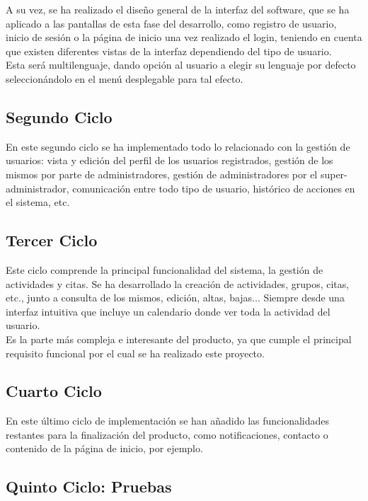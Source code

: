 A su vez, se ha realizado el diseño general de la interfaz del software, que se ha aplicado a las pantallas de esta fase del desarrollo, como registro de usuario, inicio de sesión o la página de inicio una vez realizado el login, teniendo en cuenta que existen diferentes vistas de la interfaz dependiendo del tipo de usuario. \\
Esta será multilenguaje, dando opción al usuario a elegir su lenguaje por defecto seleccionándolo en el menú desplegable para tal efecto.

\subsection{Segundo Ciclo}

En este segundo ciclo se ha implementado todo lo relacionado con la gestión de usuarios: vista y edición del perfil de los usuarios registrados, gestión de los mismos por parte de administradores, gestión de administradores por el super-administrador, comunicación entre todo tipo de usuario, histórico de acciones en el sistema, etc.

\subsection{Tercer Ciclo}

Este ciclo comprende la principal funcionalidad del sistema, la gestión de actividades y citas. Se ha desarrollado la creación de actividades, grupos, citas, etc., junto a consulta de los mismos, edición, altas, bajas... Siempre desde una interfaz intuitiva que incluye un calendario donde ver toda la actividad del usuario. 
\\

Es la parte más compleja e interesante del producto, ya que cumple el principal requisito funcional por el cual se ha realizado este proyecto.

\subsection{Cuarto Ciclo}

En este último ciclo de implementación se han añadido las funcionalidades restantes para la finalización del producto, como notificaciones, contacto o contenido de la página de inicio, por ejemplo. 


\subsection{Quinto Ciclo: Pruebas}


